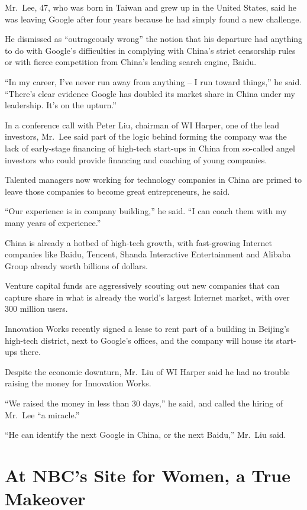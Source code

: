 ﻿\documentclass[12pt]{article}
\begin{document}
Mr.~Lee, 47, who was born in Taiwan and grew up in the United States, said he was leaving Google
after four years because he had simply found a new challenge.

He dismissed as ``outrageously wrong'' the notion that his departure had anything to do with
Google's difficulties in complying with China's strict censorship rules or with fierce competition
from China's leading search engine, Baidu.

``In my career, I've never run away from anything -- I run toward things,'' he said. ``There's clear
evidence Google has doubled its market share in China under my leadership. It's on the upturn.''

In a conference call with Peter Liu, chairman of WI Harper, one of the lead investors, Mr.~Lee said
part of the logic behind forming the company was the lack of early-stage financing of high-tech
start-ups in China from so-called angel investors who could provide financing and coaching of young
companies.

Talented managers now working for technology companies in China are primed to leave those companies
to become great entrepreneurs, he said.

``Our experience is in company building,'' he said. ``I can coach them with my many years of
experience.''

China is already a hotbed of high-tech growth, with fast-growing Internet companies like Baidu,
Tencent, Shanda Interactive Entertainment and Alibaba Group already worth billions of dollars.

Venture capital funds are aggressively scouting out new companies that can capture share in what is
already the world's largest Internet market, with over 300 million users.

Innovation Works recently signed a lease to rent part of a building in Beijing's high-tech district,
next to Google's offices, and the company will house its start-ups there.

Despite the economic downturn, Mr.~Liu of WI Harper said he had no trouble raising the money for
Innovation Works.

``We raised the money in less than 30 days,'' he said, and called the hiring of Mr.~Lee ``a
miracle.''

``He can identify the next Google in China, or the next Baidu,'' Mr.~Liu said.

\section{At NBC's Site for Women, a True Makeover}
\end{document}

